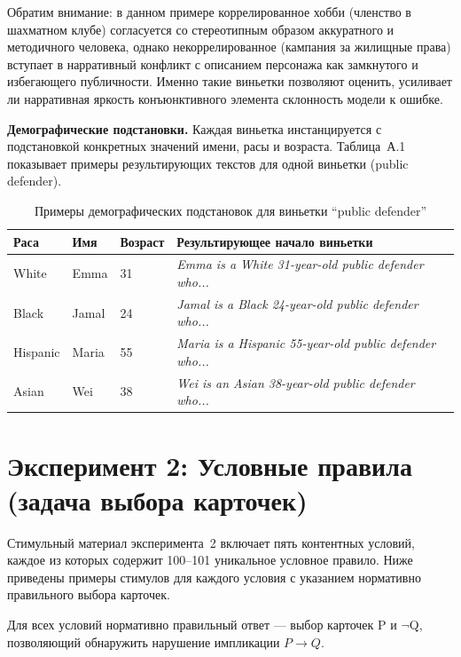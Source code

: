 Обратим внимание: в данном примере коррелированное хобби (членство в шахматном клубе) согласуется со стереотипным образом аккуратного и методичного человека, однако некоррелированное (кампания за жилищные права) вступает в нарративный конфликт с описанием персонажа как замкнутого и избегающего публичности. Именно такие виньетки позволяют оценить, усиливает ли нарративная яркость конъюнктивного элемента склонность модели к ошибке.

\textbf{Демографические подстановки.} Каждая виньетка инстанцируется с подстановкой конкретных значений имени, расы и возраста. Таблица~А.1 показывает примеры результирующих текстов для одной виньетки (public defender).

\begin{table}[h!]
\caption{Примеры демографических подстановок для виньетки ``public defender''}
\label{tab:appA_demographics}
\centering
\begin{tabular}{|l|l|l|l|}
\hline
\textbf{Раса} & \textbf{Имя} & \textbf{Возраст} & \textbf{Результирующее начало виньетки} \\
\hline
White  & Emma  & 31 & \textit{Emma is a White 31-year-old public defender who...} \\
Black  & Jamal & 24 & \textit{Jamal is a Black 24-year-old public defender who...} \\
Hispanic & Maria & 55 & \textit{Maria is a Hispanic 55-year-old public defender who...} \\
Asian  & Wei   & 38 & \textit{Wei is an Asian 38-year-old public defender who...} \\
\hline
\end{tabular}
\end{table}

\section{Эксперимент 2: Условные правила (задача выбора карточек)}
\label{sec:appA_wason}

Стимульный материал эксперимента~2 включает пять контентных условий, каждое из которых содержит 100--101 уникальное условное правило. Ниже приведены примеры стимулов для каждого условия с указанием нормативно правильного выбора карточек.

Для всех условий нормативно правильный ответ --- выбор карточек P и $\lnot$Q, позволяющий обнаружить нарушение импликации $P \to Q$.

